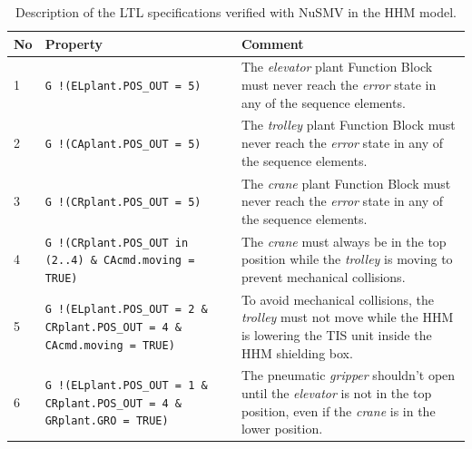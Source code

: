 \documentclass{ieeeojies}
\begin{document}
\begin{table}[!hb]
    \centering\small
    \renewcommand{\arraystretch}{1.5}
    \begin{tabularx}{\textwidth}{ m{} m{} m{} }
        \hline
        No & Property & Comment                                                                         \\ 
        \hline
        1   & \texttt{G !(ELplant.POS\_OUT = 5)} &  
        The \textit{elevator} plant Function Block must never reach the \textit{error} state in any of the sequence elements.                                                 
        \\ 
        2   & \texttt{G !(CAplant.POS\_OUT = 5)} &  
        The \textit{trolley} plant Function Block must never reach the \textit{error} state in any of the sequence elements.                                                       
        \\ 
        3   & \texttt{G !(CRplant.POS\_OUT = 5)} &                                                    The \textit{crane} plant Function Block must never reach the \textit{error} state in any of the sequence elements.                                                       
        \\ 
        4   & \texttt{G !(CRplant.POS\_OUT in (2..4) \& CAcmd.moving = TRUE)} &                       
        The \textit{crane} must always be in the top position while the \textit{trolley} is moving to prevent mechanical collisions.
        \\      
        5   & \texttt{G !(ELplant.POS\_OUT = 2 \& CRplant.POS\_OUT = 4 \& CAcmd.moving = TRUE)} &     
        To avoid mechanical collisions, the \textit{trolley} must not move while the HHM is lowering the TIS unit inside the HHM shielding box.      
        \\ 
        6   & \texttt{G !(ELplant.POS\_OUT = 1 \& CRplant.POS\_OUT = 4 \& GRplant.GRO = TRUE)} &      
        The pneumatic \textit{gripper} shouldn't open until the \textit{elevator} is not in the top position, even if the \textit{crane} is in the lower position.       
        \\ 
        \hline
    \end{tabularx}
    \caption{Description of the LTL specifications verified with NuSMV in the HHM model.}
    \label{table:1}
\end{table}
\end{document}
